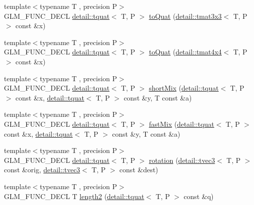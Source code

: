 \begin{DoxyCompactItemize}
{\footnotesize template$<$typename T , precision P$>$ }\\G\+L\+M\+\_\+\+F\+U\+N\+C\+\_\+\+D\+E\+CL \hyperlink{structglm_1_1detail_1_1tquat}{detail\+::tquat}$<$ T, P $>$ \hyperlink{group__gtx__quaternion_ga7647cfc0f26055a4eea4f99a35964d7b}{to\+Quat} (\hyperlink{structglm_1_1detail_1_1tmat3x3}{detail\+::tmat3x3}$<$ T, P $>$ const \&x)
\item 
{\footnotesize template$<$typename T , precision P$>$ }\\G\+L\+M\+\_\+\+F\+U\+N\+C\+\_\+\+D\+E\+CL \hyperlink{structglm_1_1detail_1_1tquat}{detail\+::tquat}$<$ T, P $>$ \hyperlink{group__gtx__quaternion_gab2e47ea15791ee85dfacfd9e952bad64}{to\+Quat} (\hyperlink{structglm_1_1detail_1_1tmat4x4}{detail\+::tmat4x4}$<$ T, P $>$ const \&x)
\item 
{\footnotesize template$<$typename T , precision P$>$ }\\G\+L\+M\+\_\+\+F\+U\+N\+C\+\_\+\+D\+E\+CL \hyperlink{structglm_1_1detail_1_1tquat}{detail\+::tquat}$<$ T, P $>$ \hyperlink{group__gtx__quaternion_ga297f92682708e59bda1849ca3aad0fea}{short\+Mix} (\hyperlink{structglm_1_1detail_1_1tquat}{detail\+::tquat}$<$ T, P $>$ const \&x, \hyperlink{structglm_1_1detail_1_1tquat}{detail\+::tquat}$<$ T, P $>$ const \&y, T const \&a)
\item 
{\footnotesize template$<$typename T , precision P$>$ }\\G\+L\+M\+\_\+\+F\+U\+N\+C\+\_\+\+D\+E\+CL \hyperlink{structglm_1_1detail_1_1tquat}{detail\+::tquat}$<$ T, P $>$ \hyperlink{group__gtx__quaternion_ga5d1bb2670d0c73fff5912134ba7c024c}{fast\+Mix} (\hyperlink{structglm_1_1detail_1_1tquat}{detail\+::tquat}$<$ T, P $>$ const \&x, \hyperlink{structglm_1_1detail_1_1tquat}{detail\+::tquat}$<$ T, P $>$ const \&y, T const \&a)
\item 
{\footnotesize template$<$typename T , precision P$>$ }\\G\+L\+M\+\_\+\+F\+U\+N\+C\+\_\+\+D\+E\+CL \hyperlink{structglm_1_1detail_1_1tquat}{detail\+::tquat}$<$ T, P $>$ \hyperlink{group__gtx__quaternion_ga964b26fdcd9f6f694c1003b0571092a6}{rotation} (\hyperlink{structglm_1_1detail_1_1tvec3}{detail\+::tvec3}$<$ T, P $>$ const \&orig, \hyperlink{structglm_1_1detail_1_1tvec3}{detail\+::tvec3}$<$ T, P $>$ const \&dest)
\item 
{\footnotesize template$<$typename T , precision P$>$ }\\G\+L\+M\+\_\+\+F\+U\+N\+C\+\_\+\+D\+E\+CL T \hyperlink{group__gtx__quaternion_gaac8d704c7dfac92835109953b88f1c92}{length2} (\hyperlink{structglm_1_1detail_1_1tquat}{detail\+::tquat}$<$ T, P $>$ const \&q)

\end{DoxyCompactItemize}
